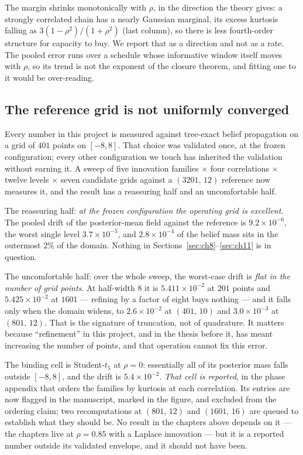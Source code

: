 \documentclass[11pt,a4paper]{article}
\begin{document}
The margin shrinks monotonically with $\rho$, in the direction the theory gives: a strongly
correlated chain has a nearly Gaussian marginal, its excess kurtosis falling as
$3(1-\rho^2)/(1+\rho^2)$ (last column), so there is less fourth-order structure for capacity to
buy. We report that as a direction and not as a rate. The pooled error runs over a schedule whose
informative window itself moves with $\rho$, so its trend is not the exponent of the closure
theorem, and fitting one to it would be over-reading.

\subsection{The reference grid is not uniformly converged}\label{sec:grid}

Every number in this project is measured against tree-exact belief propagation on a grid of $401$
points on $[-8,8]$. That choice was validated once, at the frozen configuration; every other
configuration we touch has inherited the validation without earning it. A sweep of five innovation
families $\times$ four correlations $\times$ twelve levels $\times$ seven candidate grids against a
$(3201,\,12)$ reference now measures it, and the result has a reassuring half and an uncomfortable
half.

The reassuring half: \emph{at the frozen configuration the operating grid is excellent}. The
pooled drift of the posterior-mean field against the reference is $9.2\times10^{-6}$, the worst
single level $3.7\times10^{-5}$, and $2.8\times10^{-4}$ of the belief mass sits in the outermost
$2\%$ of the domain. Nothing in Sections~\ref{sec:ch8}--\ref{sec:ch11} is in question.

The uncomfortable half: over the whole sweep, the worst-case drift is \emph{flat in the number of
grid points}. At half-width $8$ it is $5.411\times10^{-2}$ at $201$ points and
$5.425\times10^{-2}$ at $1601$ --- refining by a factor of eight buys nothing --- and it falls
only when the domain widens, to $2.6\times10^{-2}$ at $(401,\,10)$ and $3.0\times10^{-3}$ at
$(801,\,12)$. That is the signature of truncation, not of quadrature. It matters because
``refinement'' in this project, and in the thesis before it, has meant increasing the number of
points, and that operation cannot fix this error.

The binding cell is Student-$t_5$ at $\rho=0$: essentially all of its posterior mass falls outside
$[-8,8]$, and the drift is $5.4\times10^{-2}$. \emph{That cell is reported}, in the phase appendix
that orders the families by kurtosis at each correlation. Its entries are now flagged in the
manuscript, marked in the figure, and excluded from the ordering claim; two recomputations at
$(801,\,12)$ and $(1601,\,16)$ are queued to establish what they should be. No result in the
chapters above depends on it --- the chapters live at $\rho=0.85$ with a Laplace innovation --- but
it is a reported number outside its validated envelope, and it should not have been.
\end{document}
